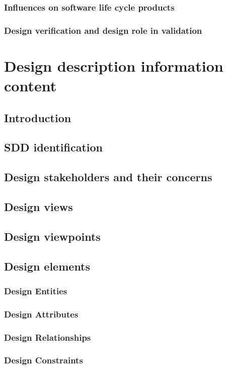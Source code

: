 \documentclass[onecolumn, draftclsnofoot,10pt, compsoc]{IEEEtran}
\begin{document}
\begin{singlespace}
		\subsubsection{Influences on software life cycle products}
		\subsubsection{Design verification and design role in validation}
\section{Design description information content}
	\subsection{Introduction}
	\subsection{SDD identification}
	\subsection{Design stakeholders and their concerns}
	\subsection{Design views}
	\subsection{Design viewpoints}
	\subsection{Design elements}
		\subsubsection{Design Entities}
		\subsubsection{Design Attributes}
		\subsubsection{Design Relationships}
		\subsubsection{Design Constraints}

\end{singlespace}
\end{document}
